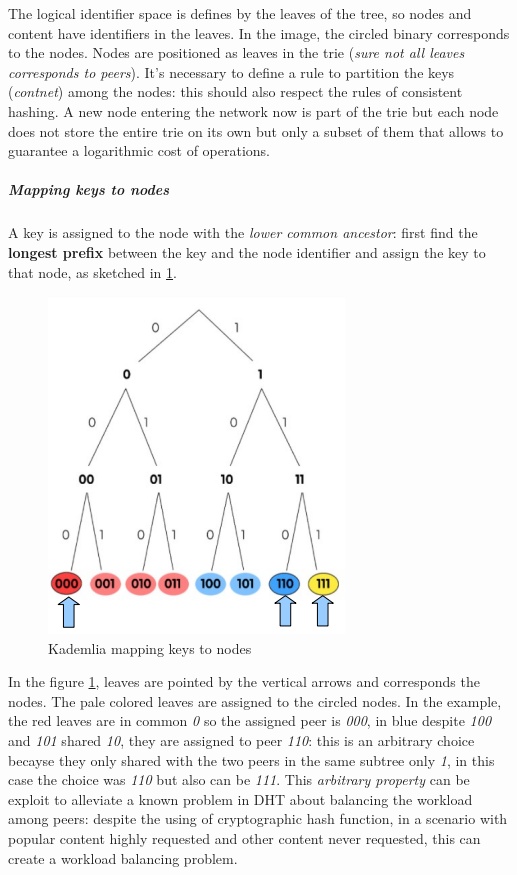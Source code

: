 \documentclass[10pt,a4paper]{report}
\begin{document}
The logical identifier space is defines by the leaves of the tree, so nodes and content have identifiers in the leaves. In the image, the circled binary corresponds to the nodes. Nodes are positioned as leaves in the trie (\textit{sure not all leaves corresponds to peers}). It's necessary to define a rule to partition the keys (\textit{contnet}) among the nodes: this should also respect the rules of consistent hashing.
A new node entering the network now is part of the trie but each node does not store the entire trie on its own but only a subset of them that allows to guarantee a logarithmic cost of operations.
\subparagraph{Mapping keys to nodes}\label{sec:mapping-keys-to-nodes}
A key is assigned to the node with the \textit{lower common ancestor}: first find the \textbf{longest prefix} between the key and the node identifier and assign the key to that node, as sketched in \ref{kademlia-mapping-keys}.
\begin{figure}[b]
	\centering
	\includegraphics[scale=0.50]{images/Pasted image 20230303143423.png}
	\caption{Kademlia mapping keys to nodes}
	\label{kademlia-mapping-keys}
\end{figure}

In the figure \ref{kademlia-mapping-keys}, leaves are pointed by the vertical arrows and corresponds the nodes. The pale colored leaves are assigned to the circled nodes. In the example, the red leaves are in common \textit{0} so the assigned peer is \textit{000}, in blue despite \textit{100} and \textit{101} shared \textit{10}, they are assigned to peer \textit{110}: this is an arbitrary choice becayse they only shared with the two peers in the same subtree only \textit{1}, in this case the choice was \textit{110} but also can be \textit{111}.
This \textit{arbitrary property} can be exploit to alleviate a known problem in DHT about balancing the workload among peers: despite the using of cryptographic hash function, in a scenario with popular content highly requested and other content never requested, this can create a workload balancing problem.
\end{document}
